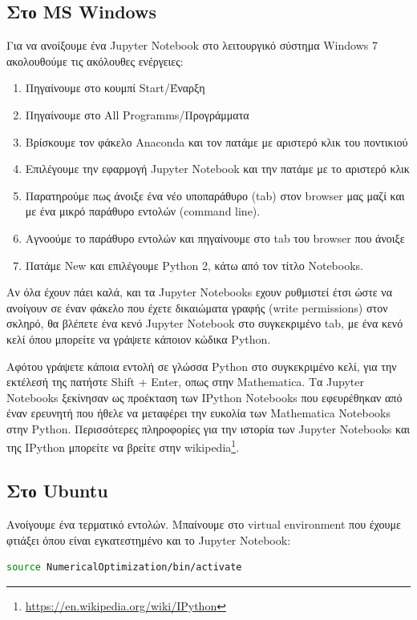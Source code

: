 \documentclass[a4paper,12pt,twoside]{report}
\theoremstyle{plain}
\theoremstyle{definition}
\theoremstyle{remark}
\begin{document}
\subsection{Στо MS Windows}

Για να ανοίξουμε ένα Jupyter Notebook στο λειτουργικό σύστημα Windows 7 ακολουθούμε τις ακόλουθες ενέργειες:

\begin{enumerate}
\item Πηγαίνουμε στο κουμπί Start/Έναρξη
\item Πηγαίνουμε στο All Programms/Προγράμματα
\item Βρίσκουμε τον φάκελο Anaconda και τον πατάμε με αριστερό κλικ του ποντικιού
\item Επιλέγουμε την εφαρμογή Jupyter Notebook και την πατάμε με το αριστερό κλικ
\item Παρατηρούμε πως άνοιξε ένα νέο υποπαράθυρο (tab) στον browser μας μαζί και με ένα μικρό παράθυρο εντολών (command line). 
\item Αγνοούμε το παράθυρο εντολών και πηγαίνουμε στο tab του browser που άνοιξε
\item Πατάμε New και επιλέγουμε Python 2, κάτω από τον τίτλο Notebooks.
\end{enumerate}

Αν όλα έχουν πάει καλά, και τα Jupyter Notebooks εχουν ρυθμιστεί έτσι ώστε να ανοίγουν σε έναν φάκελο που έχετε δικαιώματα γραφής (write permissions) στον σκληρό, θα βλέπετε ένα κενό Jupyter Notebook στο συγκεκριμένο tab, με ένα κενό κελί όπου μπορείτε να γράψετε κάποιον κώδικα Python.

Αφότου γράψετε κάποια εντολή σε γλώσσα Python στο συγκεκριμένο κελί, για την εκτέλεσή της πατήστε Shift + Enter, οπως στην Mathematica. Τα Jupyter Notebooks ξεκίνησαν ως προέκταση των IPython Notebooks που εφευρέθηκαν από έναν ερευνητή που ήθελε να μεταφέρει την ευκολία των Mathematica Notebooks στην Python. Περισσότερες πληροφορίες για την ιστορία των Jupyter Notebooks και της IPython μπορείτε να βρείτε στην wikipedia\footnote{\url{https://en.wikipedia.org/wiki/IPython}}.

\subsection{Στο Ubuntu}

Ανοίγουμε ένα τερματικό εντολών. Μπαίνουμε στο virtual environment που έχουμε φτιάξει όπου είναι εγκατεστημένο και το Jupyter Notebook:

\begin{lstlisting}[extendedchars=true,language=bash]
source NumericalOptimization/bin/activate
\end{lstlisting}
\end{document}

